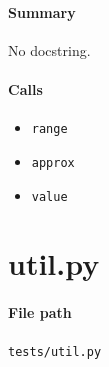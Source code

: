 \documentclass[11pt]{report}
\begin{document}
\paragraph{Summary} No docstring.
\paragraph{Calls}
\begin{itemize}[leftmargin=*]
  \item \texttt{range}
  \item \texttt{approx}
  \item \texttt{value}
\end{itemize}

\section{util.py}
\label{file:tests-util.py}
\paragraph{File path} \texttt{tests/util.py}
\end{document}
